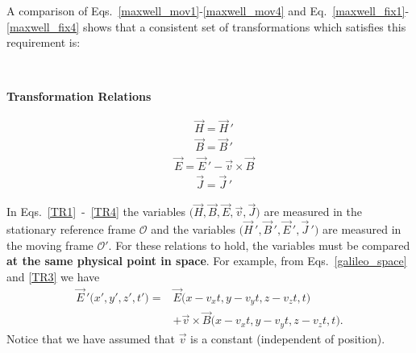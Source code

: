 \documentclass[11pt,a4paper,oneside]{book}
\numberwithin{equation}{section}
\theoremstyle{it}
\theoremstyle{definition}
\begin{document}
A comparison of Eqs.~\ref{maxwell_mov1}-\ref{maxwell_mov4} and 
Eq.~\ref{maxwell_fix1}-\ref{maxwell_fix4} shows that a consistent set of 
transformations which satisfies this requirement is:
\begin{mybox}
	\bigskip \ \newline	\centerline{\textbf{Transformation Relations}}
	\begin{equation}\label{TR1}
		\begin{aligned}
			&\vec{H}=\vec{H}\,'
		\end{aligned}
	\end{equation} 
	\begin{equation}\label{TR2}
		\begin{aligned}
			&\vec{B}=\vec{B}\,'
		\end{aligned}
	\end{equation} 
	\begin{equation}\label{TR3}
		\begin{aligned}
			&\vec{E} =\vec{E}\,'-\vec{v}\times\vec{B}
		\end{aligned}
	\end{equation} 
	\begin{equation}\label{TR4}
		\begin{aligned}
			&\vec{J}=\vec{J}\,'
		\end{aligned}
	\end{equation} 
\end{mybox}
In Eqs.~\ref{TR1}~-~\ref{TR4} the variables 
$\big(\vec{H},\vec{B},\vec{E},\vec{v},\vec{J}\big)$ are measured in the 
stationary reference frame $\mathcal{O}$ and the variables 
$\big(\vec{H}\,',\vec{B}\,',\vec{E}\,',\vec{J}\,'\big)$ are measured in the 
moving frame $\mathcal{O}'$. For these relations to hold, the variables must be 
compared \textbf{at the same physical point in space}. For example, from 
Eqs.~\ref{galileo_space} and \ref{TR3} we have
\begin{equation*}
	\begin{aligned}
		\vec{E}\,'\big(x',y',z',t'\big)= & 
		\vec{E}\big(x-v_xt,y-v_yt,z-v_zt,t\big) \\[8pt]
		&+ \vec{v}\times\vec{B}\big(x-v_xt,y-v_yt,z-v_zt,t\big).
	\end{aligned}
\end{equation*} 
Notice that we have assumed that $\vec{v}$ is a constant (independent of 
position). 
\end{document}

